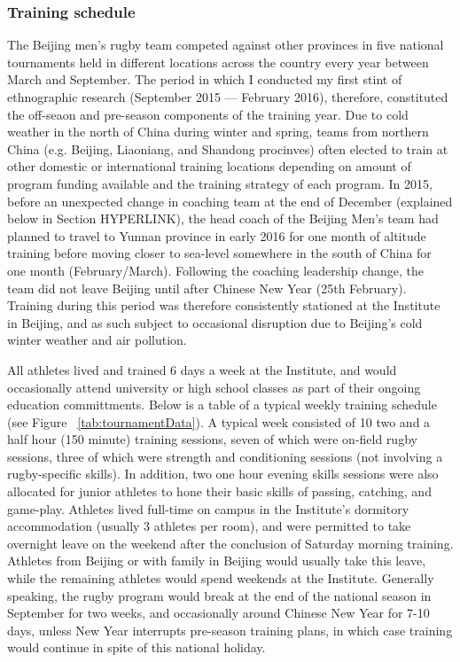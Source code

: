 

\subsubsection{Training schedule}

 The Beijing men's rugby team competed against other provinces in five national tournaments held in different locations across the country   every year between March and September. The period in which I conducted my first stint of ethnographic research (September 2015 –-- February 2016), therefore, constituted the off-seaon and pre-season components of the training year.  Due to cold weather in the north of China during winter and spring, teams from northern China (e.g. Beijing, Liaoniang, and Shandong procinves) often elected to train   at other domestic or international training locations depending on amount of program funding available and the training strategy of each program.  In 2015, before an unexpected change in coaching team at the end of December (explained below in Section HYPERLINK), the head coach of the Beijing Men's team had planned to travel to Yunnan province in early 2016 for one month of altitude training before moving closer to sea-level somewhere in the south of China for one month (February/March).  Following the coaching leadership change, the team did not leave Beijing until after Chinese New Year (25th February). Training during this period was therefore consistently stationed at the Institute in Beijing, and as such subject to occasional disruption due to Beijing's cold winter weather and air pollution.

 All athletes lived and trained 6 days a week at the Institute, and would occasionally attend university or high school classes as part of their ongoing education committments.  Below is a table of a typical weekly training schedule (see Figure ~\ref{tab:tournamentData}). A typical week consisted of 10 two and a half hour (150 minute) training sessions, seven of which were on-field rugby sessions, three of which were strength and conditioning sessions (not involving a rugby-specific skills).  In addition, two one hour evening skills sessions were also allocated for junior athletes to hone their basic skills of passing, catching, and game-play.  Athletes lived full-time on campus in the Institute's dormitory accommodation (usually 3 athletes per room), and were permitted to take overnight leave on the weekend after the conclusion of Saturday morning training.  Athletes from Beijing or with family in Beijing would usually take this leave, while the remaining athletes would spend weekends at the Institute.  Generally speaking, the rugby program would break at the end of the national season in September for two weeks, and occasionally around Chinese New Year for 7-10 days, unless New Year interrupts pre-season training plans, in which case training would continue in spite of this national holiday.

